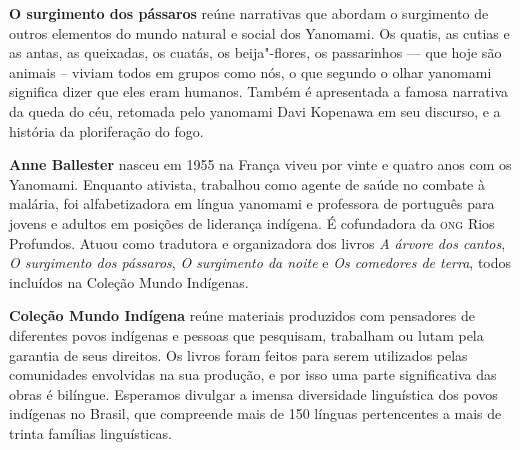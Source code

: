 \textbf{O surgimento dos pássaros} \lipsum[1] reúne narrativas que abordam o surgimento de outros elementos
do mundo natural e social dos Yanomami. Os quatis, as cutias e as antas, as queixadas, os cuatás, os beija"-flores, os passarinhos --- que hoje são animais -- viviam todos em grupos como nós, o que segundo o olhar yanomami significa dizer que eles eram humanos. Também é apresentada a famosa narrativa da queda do céu, retomada pelo yanomami Davi Kopenawa em seu discurso, e a história da ploriferação do fogo. 

\textbf{Anne Ballester} nasceu em 1955 na França viveu por vinte e quatro anos com os Yanomami. 
Enquanto ativista, trabalhou como agente de saúde no combate à malária, foi alfabetizadora em língua 
yanomami e professora de português para jovens e adultos em posições de liderança indígena. É cofundadora da \textsc{ong} Rios Profundos. Atuou como tradutora e organizadora dos livros \textit{A árvore dos cantos}, \textit{O surgimento dos pássaros}, \textit{O surgimento da noite} e \textit{Os comedores de terra}, todos incluídos na Coleção Mundo Indígenas.

\textbf{Coleção Mundo Indígena} reúne materiais produzidos com pensadores de diferentes povos indígenas e pessoas que pesquisam, trabalham ou lutam pela garantia de seus direitos. Os livros foram feitos para serem utilizados pelas comunidades envolvidas na sua produção, e por isso uma parte significativa das obras é bilíngue. Esperamos divulgar a imensa diversidade linguística dos povos indígenas no Brasil, que compreende mais de 150 línguas pertencentes a mais de trinta famílias linguísticas.



